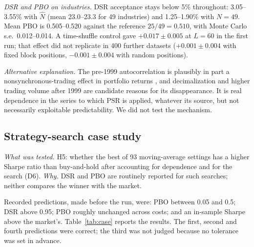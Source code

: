 \documentclass[11pt,a4paper]{article}
\theoremstyle{remark}
\begin{document}
\emph{DSR and PBO on industries.} DSR acceptance stays below 5\% throughout: 3.05--3.55\% with $\hat N$ (mean 23.0--23.3 for 49 industries) and 1.25--1.90\% with $N=49$. Mean PBO is 0.505--0.520 against the reference $25/49=0.510$, with Monte Carlo s.e.\ 0.012--0.014. A time-shuffle control gave $+0.017\pm0.005$ at $L=60$ in the first run; that effect did not replicate in 400 further datasets ($+0.001\pm0.004$ with fixed block positions, $-0.001\pm0.004$ with random positions).

\emph{Alternative explanation.} The pre-1999 autocorrelation is plausibly in part a nonsynchronous-trading effect in portfolio returns \citep{lo1990}, and decimalization and higher trading volume after 1999 are candidate reasons for its disappearance. It is real dependence in the series to which PSR is applied, whatever its source, but not necessarily exploitable predictability. We did not test the mechanism.

\subsection{Strategy-search case study}\label{sec:res:case}

\emph{What was tested.} H5: whether the best of 93 moving-average settings has a higher Sharpe ratio than buy-and-hold after accounting for dependence and for the search (D6). \emph{Why.} DSR and PBO are routinely reported for such searches; neither compares the winner with the market.

Recorded predictions, made before the run, were: PBO between 0.05 and 0.5; DSR above 0.95; PBO roughly unchanged across costs; and an in-sample Sharpe above the market's. Table~\ref{tab:case} reports the results. The first, second and fourth predictions were correct; the third was not judged because no tolerance was set in advance.
\end{document}
